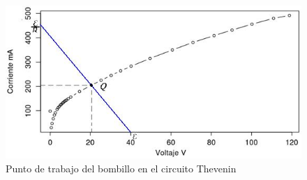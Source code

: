 \documentclass[twocolumn]{IEEEtran}
\begin{document}
\begin{figure}[H]
	\centering
		\includegraphics[scale=0.6]{final2.png}
	\caption{Punto de trabajo del bombillo en el circuito Thevenin}
	\label{fig21}
\end{figure}
\end{document}
